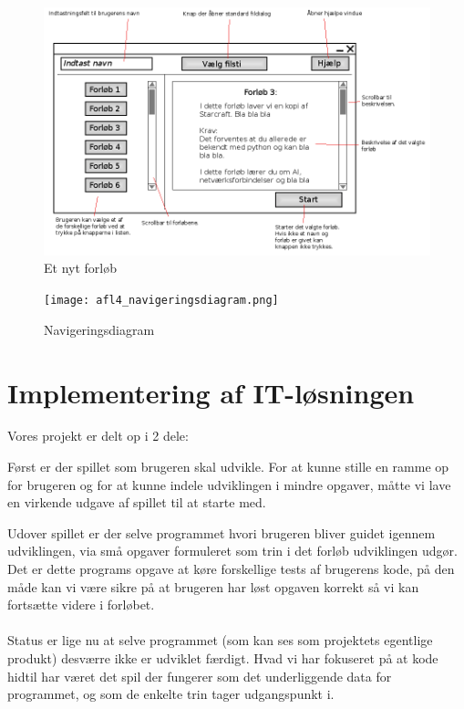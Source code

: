 \documentclass[10pt,a4paper,danish]{article}
\begin{document}
\begin{figure}[h]
  \begin{center}
    \includegraphics[scale=0.5]{nytforloeb.png}
    \caption{Et nyt forløb}
    \label{fig:nytforloeb}
  \end{center}
\end{figure}
\newpage

\begin{figure}[htb]
  \begin{center}
    \texttt{[image: afl4\_navigeringsdiagram.png]}
    \caption{Navigeringsdiagram}
    \label{fig:navigeringsdiagram}
  \end{center}
\end{figure}
\newpage

\section{Implementering af IT-løsningen}
Vores projekt er delt op i 2 dele:

Først er der spillet som brugeren skal udvikle. 
For at kunne stille en ramme op for brugeren og for at kunne indele udviklingen i mindre opgaver, måtte vi lave en virkende udgave af spillet til at starte med.

Udover spillet er der selve programmet hvori brugeren bliver guidet igennem udviklingen, via små opgaver formuleret som trin i det forløb udviklingen udgør.
Det er dette programs opgave at køre forskellige tests af brugerens kode, på den måde kan vi være sikre på at brugeren har løst opgaven korrekt så vi kan fortsætte videre i forløbet.

\paragraph{}
Status er lige nu at selve programmet (som kan ses som projektets egentlige produkt) desværre ikke er udviklet færdigt. Hvad vi har fokuseret på at kode hidtil har været det spil der fungerer som det underliggende data for programmet, og som de enkelte trin tager udgangspunkt i.
\end{document}
